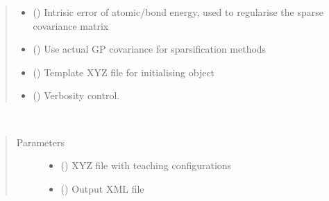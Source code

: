 \documentclass[letterpaper,10pt,english]{sphinxmanual}
\begin{document}
\begin{fulllineitems}
\begin{quote}
\begin{description}
\begin{itemize}
\item {} 
 () \textendash{} Intrisic error of atomic/bond energy, used to regularise the sparse covariance matrix

\item {} 
 () \textendash{} Use actual GP covariance for sparsification methods

\item {} 
 () \textendash{} Template XYZ file for initialising object

\item {} 
 ({\hyperref[\detokenize{gap:gap.Verbose}]{}}) \textendash{} Verbosity control.

\end{itemize}

\end{description}\end{quote}

\begin{fulllineitems}
\label{\detokenize{gap:gap.GAP.teach}}~\begin{quote}\begin{description}
\item[{Parameters}] \leavevmode\begin{itemize}
\item {} 
 () \textendash{} XYZ file with teaching configurations

\item {} 
 () \textendash{} Output XML file


\end{itemize}
\end{description}
\end{quote}
\end{fulllineitems}
\end{fulllineitems}
\end{document}
